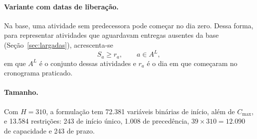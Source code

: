 \paragraph{Variante com datas de liberação.}
Na base, uma atividade sem predecessora pode começar no dia zero. Dessa forma, para
representar atividades que aguardavam entregas ausentes da
base (Seção~\ref{sec:largadas}), acrescenta-se
\begin{equation}
  S_a \ge r_a, \qquad a\in A^{L},
  \label{eq:liberacao}
\end{equation}
em que $A^{L}$ é o conjunto dessas atividades e $r_a$ é o dia em que
começaram no cronograma praticado.

\paragraph{Tamanho.}
Com $H=310$, a formulação tem 72.381 variáveis binárias de início, além de
$C_{\max}$, e 13.584 restrições: 243 de início único, 1.008 de precedência,
$39\times310=12.090$ de capacidade e 243 de prazo.
